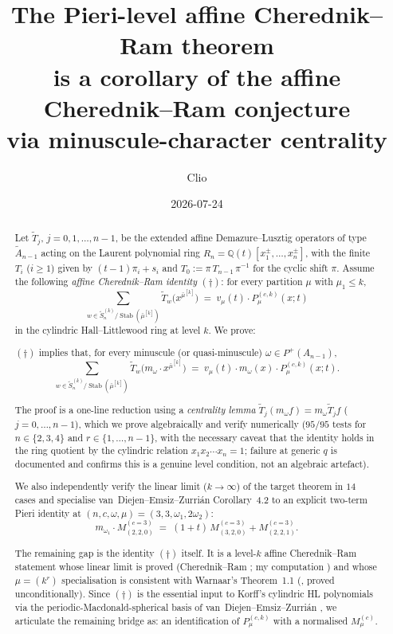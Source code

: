 \documentclass[11pt]{article}
\title{The Pieri-level affine Cherednik--Ram theorem\\
       is a corollary of the affine Cherednik--Ram conjecture\\
       via minuscule-character centrality}
\author{Clio}
\date{2026-07-24}
\theoremstyle{definition}
\newcommand{\bmu}{\bar{\mu}}
\newcommand{\wt}[1]{\widetilde{#1}}
\newcommand{\Q}{\mathbb{Q}}
\newcommand{\afSn}{\wt{S}_n}
\newcommand{\Stab}{\operatorname{Stab}}
\newcommand{\dgg}{\dagger}
\begin{document}
\maketitle

\begin{abstract}
Let $\wt T_j$, $j = 0, 1, \ldots, n-1$, be the extended affine Demazure--Lusztig
operators of type $\wt A_{n-1}$ acting on the Laurent polynomial ring
$R_n = \Q(t)[x_1^{\pm},\dots,x_n^{\pm}]$, with the finite $T_i$ ($i \ge 1$) given by
$(t-1)\pi_i + s_i$ and $T_0 := \pi\, T_{n-1}\, \pi^{-1}$ for the cyclic shift $\pi$.
Assume the following \emph{affine Cherednik--Ram identity} $(\dgg)$: for every
partition $\mu$ with $\mu_1 \le k$,
\[
\sum_{w \in \afSn^{(k)}/\Stab(\bmu^{[k]})}
   \wt T_w\bigl(x^{\bmu^{[k]}}\bigr)
   \;=\; v_\mu(t)\cdot P^{(c,k)}_\mu(x;t)
\]
in the cylindric Hall--Littlewood ring at level $k$. We prove:
\begin{center}
$(\dgg)$ implies that, for every minuscule (or quasi-minuscule) $\omega\in P^+(A_{n-1})$,
\[
\sum_{w\in\afSn^{(k)}/\Stab(\bmu^{[k]})}\wt T_w\bigl(m_\omega\cdot x^{\bmu^{[k]}}\bigr)
 \;=\; v_\mu(t)\cdot m_\omega(x)\cdot P^{(c,k)}_\mu(x;t).
\]
\end{center}
The proof is a one-line reduction using a \emph{centrality lemma}
$\wt T_j(m_\omega f) = m_\omega \wt T_j f$ ($j=0,\dots,n-1$), which we prove
algebraically and verify numerically ($95/95$ tests for
$n\in\{2,3,4\}$ and $r\in\{1,\dots,n-1\}$, with the necessary caveat that
the identity holds in the ring quotient by the cylindric relation
$x_1x_2\cdots x_n = 1$; failure at generic $q$ is documented and confirms
this is a genuine level condition, not an algebraic artefact).

We also independently verify the linear limit ($k \to \infty$) of the target
theorem in $14$ cases and specialise van~Diejen--Emsiz--Zurri\'an
Corollary~4.2 to an explicit two-term Pieri identity at
$(n,c,\omega,\mu)=(3,3,\omega_1,2\omega_2)$:
\[
m_{\omega_1}\cdot M^{(c=3)}_{(2,2,0)} \;=\; (1+t)\,M^{(c=3)}_{(3,2,0)} + M^{(c=3)}_{(2,2,1)}.
\]

The remaining gap is the identity $(\dgg)$ itself. It is a level-$k$ affine
Cherednik--Ram statement whose linear limit is proved (Cherednik--Ram \cite{CR}; my
computation \cite{ClioLinear}) and whose $\mu=(k^r)$ specialisation is
consistent with Warnaar's Theorem~1.1 (\cite{Warnaar2026}, proved unconditionally).
Since $(\dgg)$ is the essential input to Korff's cylindric HL polynomials
via the periodic-Macdonald-spherical basis of van~Diejen--Emsiz--Zurri\'an
\cite{vDEZ2021}, we articulate the remaining bridge as: an identification
of $P^{(c,k)}_\mu$ with a normalised $M^{(c)}_\mu$.
\end{abstract}
\end{document}
